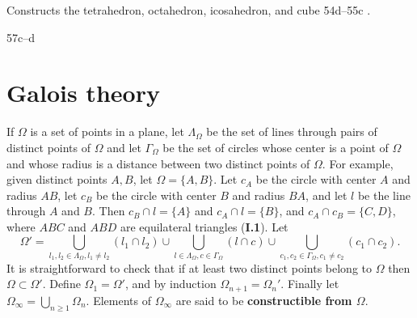 \documentclass{article}
\begin{document}
Constructs the tetrahedron, octahedron, icosahedron, and cube 54d--55c \cite[pp.~216--218]{timaeus}. 

57c--d \cite[p.~235]{timaeus}






\section{Galois theory}
If $\Omega$ is a set of points in a plane, let $\Lambda_\Omega$ be the set of lines through pairs of distinct points of $\Omega$
and let $\Gamma_\Omega$ be the set of circles whose center is a point of $\Omega$ and whose radius is a distance between two
distinct points of $\Omega$. For example, given distinct points $A,B$, let $\Omega=\{A,B\}$. Let $c_A$ be the circle with center $A$ and radius $AB$,
let $c_B$ be the circle with center $B$ and radius $BA$, and let $l$ be the line through $A$ and $B$.
Then $c_B \cap l = \{A\}$ and $c_A \cap l = \{B\}$, and
$c_A \cap c_B = \{C,D\}$, where $ABC$ and $ABD$ are equilateral triangles (\textbf{I.1}).
Let
\[
\Omega' = \bigcup_{l_1,l_2 \in \Lambda_\Omega, l_1 \neq l_2} (l_1 \cap l_2) \cup
\bigcup_{l \in \Lambda_\Omega, c \in \Gamma_\Omega} (l \cap c) \cup
 \bigcup_{c_1,c_2 \in \Gamma_\Omega, c_1 \neq c_2} (c_1 \cap c_2).
\]
It is straightforward to check that if at least two distinct points belong to $\Omega$ then $\Omega \subset \Omega'$. 
Define $\Omega_1 = \Omega'$, and by induction $\Omega_{n+1} = \Omega_n'$. 
Finally let $\Omega_\infty = \bigcup_{n \geq 1} \Omega_n$. Elements of $\Omega_\infty$ are said to be \textbf{constructible from
$\Omega$}.
\end{document}
